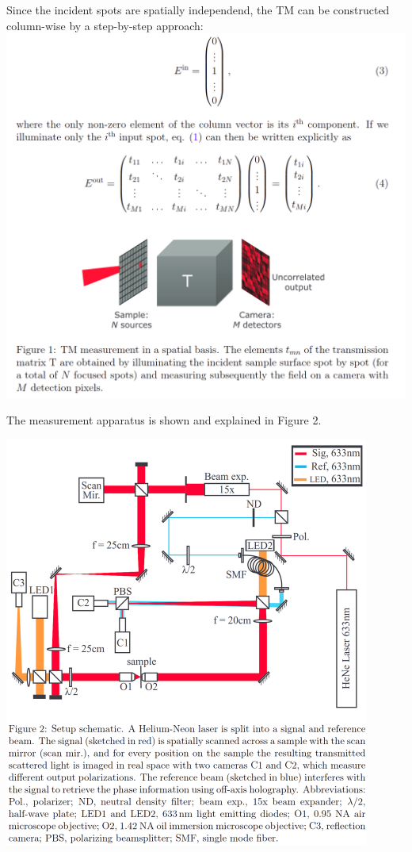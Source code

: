 \documentclass{article}
\begin{document}
Since the incident spots are spatially independend, the TM can be constructed column-wise by a step-by-step approach:
\\

\noindent\includegraphics[width=\textwidth]{figures/TM_measurement.png}

The measurement apparatus is shown and explained in Figure 2.

\noindent\includegraphics[width=0.9\textwidth]{figures/TM_setup.png}
\end{document}
